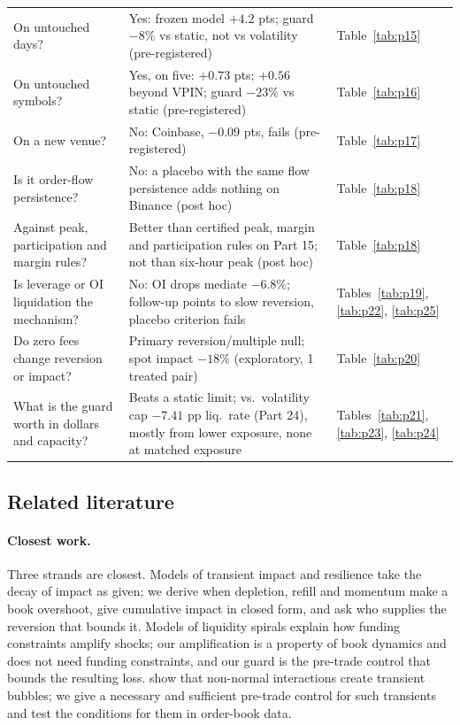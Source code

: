 \documentclass[12pt]{article}
\theoremstyle{definition}
\theoremstyle{remark}
\begin{document}
{\begin{longtable}{p{}p{}p{}}
On untouched days? & Yes: frozen model $+4.2$ pts; guard $-8\%$ vs static, not vs volatility (pre-registered) & Table~\ref{tab:p15}\\
On untouched symbols? & Yes, on five: $+0.73$ pts; $+0.56$ beyond VPIN; guard $-23\%$ vs static (pre-registered) & Table~\ref{tab:p16}\\
On a new venue? & No: Coinbase, $-0.09$ pts, fails (pre-registered) & Table~\ref{tab:p17}\\
Is it order-flow persistence? & No: a placebo with the same flow persistence adds nothing on Binance (post hoc) & Table~\ref{tab:p18}\\
Against peak, participation and margin rules? & Better than certified peak, margin and participation rules on Part 15; not than six-hour peak (post hoc) & Table~\ref{tab:p18}\\
Is leverage or OI liquidation the mechanism? & No: OI drops mediate $-6.8\%$; follow-up points to slow reversion, placebo criterion fails & Tables~\ref{tab:p19}, \ref{tab:p22}, \ref{tab:p25}\\
Do zero fees change reversion or impact? & Primary reversion/multiple null; spot impact $-18\%$ (exploratory, 1 treated pair) & Table~\ref{tab:p20}\\
What is the guard worth in dollars and capacity? & Beats a static limit; vs.\ volatility cap $-7.41$ pp liq.\ rate (Part 24), mostly from lower exposure, none at matched exposure & Tables~\ref{tab:p21}, \ref{tab:p23}, \ref{tab:p24}\\
\bottomrule
\end{longtable}
}

\subsection{Related literature}

\paragraph{Closest work.} Three strands are closest. Models of transient impact and resilience \citep{obizhaeva2013,bouchaud2004,bouchaud2018} take the decay of impact as given; we derive when depletion, refill and momentum make a book overshoot, give cumulative impact in closed form, and ask who supplies the reversion that bounds it. Models of liquidity spirals \citep{brunnermeier2009,shleifer1992} explain how funding constraints amplify shocks; our amplification is a property of book dynamics and does not need funding constraints, and our guard is the pre-trade control that bounds the resulting loss. \citet{sornette2023} show that non-normal interactions create transient bubbles; we give a necessary and sufficient pre-trade control for such transients and test the conditions for them in order-book data.
\end{document}

